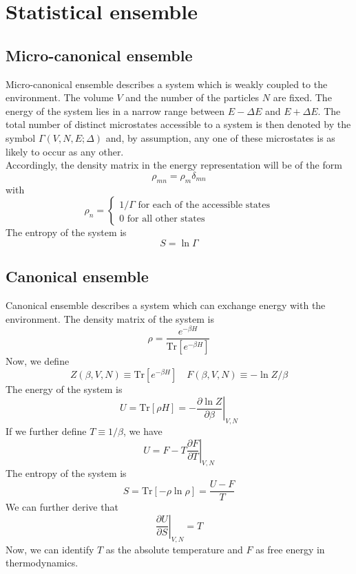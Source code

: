 \documentclass[cyan]{elegantnote}
\begin{document}
\section{Statistical ensemble}
\subsection{Micro-canonical ensemble}
Micro-canonical ensemble describes a system which is weakly coupled to the environment. The volume $V$ and the number of the particles $N$ are fixed. The energy of the system lies in a narrow range between $E-\Delta E$ and $E + \Delta E$. The total number of distinct microstates accessible to a system is then denoted by the symbol $\Gamma(V,N,E;\Delta)$ and, by assumption, any one of these microstates is as likely to occur as any other. 
\\
Accordingly, the density matrix in the energy representation will be of the form
\[\rho_{mn} = \rho_m \delta_{mn}\]
with
\[\rho_n = \begin{cases} 1/\Gamma \mbox{ for each of the accessible states} \\ 0 \mbox{ for all other states} \end{cases}\]
The entropy of the system is
\[S = \ln \Gamma\]

\subsection{Canonical ensemble}
Canonical ensemble describes a system which can exchange energy with the environment. The density matrix of the system is
\[\rho = \frac{e^{-\beta H}}{\mathrm{Tr}[e^{-\beta H}]}\]
Now, we define
\[Z(\beta,V,N) \equiv \mathrm{Tr}[e^{-\beta H}] \quad F(\beta,V,N) \equiv -\ln Z/\beta\]
The energy of the system is
\[U = \mathrm{Tr}[\rho H] = -\left. \frac{\partial \ln Z}{\partial \beta} \right|_{V,N}\]
If we further define $T \equiv 1/\beta$, we have
\[U = F - T \left. \frac{\partial F}{\partial T} \right|_{V,N}\]
The entropy of the system is
\[S = \mathrm{Tr}[-\rho\ln\rho] = \frac{U-F}{T}\]
We can further derive that
\[\left. \frac{\partial U}{\partial S}\right|_{V,N} = T\]
Now, we can identify $T$ as the absolute temperature and $F$ as free energy in thermodynamics.
\end{document}
